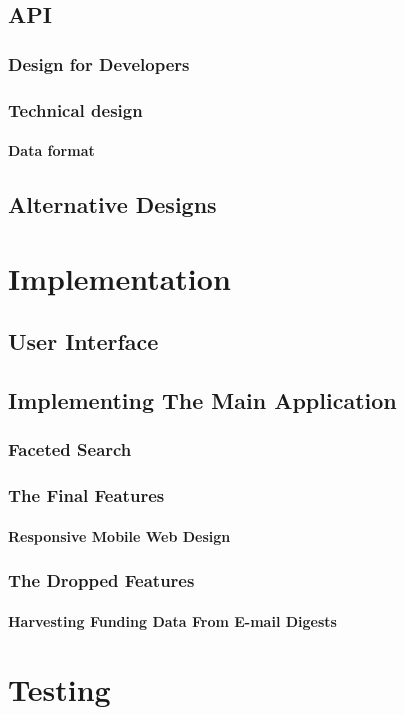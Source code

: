 \section{API}
  \subsection{Design for Developers}
  \subsection{Technical design}
  \subsubsection{Data format}
\section{Alternative Designs}
\chapter{Implementation}
\section{User Interface}
\section{Implementing The Main Application}
\subsection{Faceted Search}
\subsection{The Final Features}
\subsubsection{Responsive Mobile Web Design}
\subsection{The Dropped Features}
\subsubsection{Harvesting Funding Data From E-mail Digests}
\chapter{Testing}
